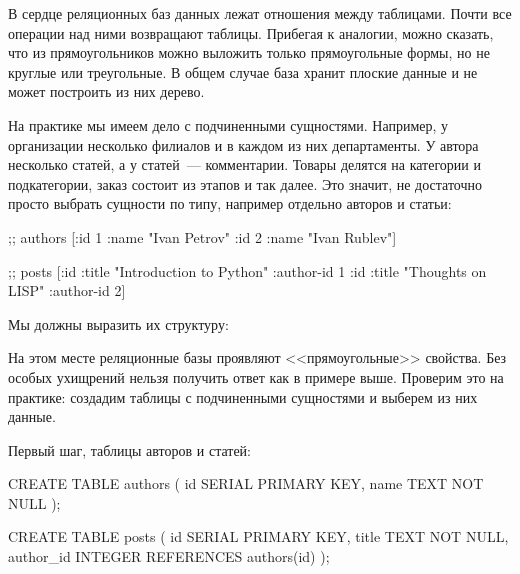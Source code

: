 В сердце реляционных баз данных лежат отношения между таблицами. Почти все операции над ними возвращают таблицы. Прибегая к аналогии, можно сказать, что из прямоугольников можно выложить только прямоугольные формы, но не круглые или треугольные. В общем случае база хранит плоские данные и не может построить из них дерево.

На практике мы имеем дело с подчиненными сущностями. Например, у организации несколько филиалов и в каждом из них департаменты. У автора несколько статей, а у статей~--- комментарии. Товары делятся на категории и подкатегории, заказ состоит из этапов и так далее. Это значит, не достаточно просто выбрать сущности по типу, например отдельно авторов и статьи:

\begin{english}
  \begin{clojure}
;; authors
[{:id 1 :name "Ivan Petrov"}
 {:id 2 :name "Ivan Rublev"}]

;; posts
[{:id :title "Introduction to Python" :author-id 1}
 {:id :title "Thoughts on LISP" :author-id 2}]
  \end{clojure}
\end{english}

Мы должны выразить их структуру:

\begin{english}
  \begin{clojure}
  \end{clojure}
\end{english}

На этом месте реляционные базы проявляют <<прямоугольные>> свойства. Без особых ухищрений нельзя получить ответ как в примере выше. Проверим это на практике: создадим таблицы с подчиненными сущностями и выберем из них данные.

Первый шаг, таблицы авторов и статей:

\begin{english}
  \begin{sql}
CREATE TABLE authors (
  id SERIAL PRIMARY KEY,
  name TEXT NOT NULL
);

CREATE TABLE posts (
  id SERIAL PRIMARY KEY,
  title TEXT NOT NULL,
  author_id INTEGER REFERENCES authors(id)
);
  \end{sql}
\end{english}

